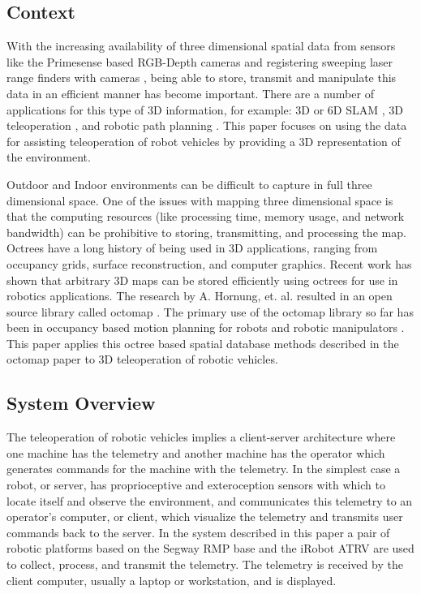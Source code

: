\documentclass[journal]{IEEEtran}
\begin{document}
  \subsection{Context}
  With the increasing availability of three dimensional spatial data from 
  sensors like the Primesense based RGB-Depth cameras \cite{PRIMESENSE} and 
  registering sweeping laser range finders with cameras \cite{5457431}, being 
  able to store, transmit and manipulate this data in an efficient manner has 
  become important.  There are a number of applications for this type of 3D 
  information, for example: 3D or 6D SLAM \cite{biswasdepth}, 3D 
  teleoperation \cite{5457431}, and robotic path planning \cite{3DCOLLISION}.
  This paper focuses on using the data for assisting teleoperation of 
  robot vehicles by providing a 3D representation of the environment.
  
  Outdoor and Indoor environments can be difficult to capture in full three 
  dimensional space.  One of the issues with mapping three dimensional 
  space is that the computing resources (like processing time, memory usage, 
  and network bandwidth) can be prohibitive to storing, transmitting, and 
  processing the map.  Octrees have a long history of being used in 3D 
  applications\cite{CITEME}, ranging from occupancy grids\cite{CITEME}, 
  surface reconstruction\cite{CITEME}, and computer graphics\cite{CITEME}.  
  Recent work has shown that arbitrary 3D maps can be stored efficiently using 
  octrees for use in robotics applications\cite{octomap}.  The research by A. 
  Hornung, et. al. resulted in an open source library called octomap 
  \cite{octomap}.  The primary use of the octomap library so far has been in 
  occupancy based motion planning for robots and robotic manipulators 
  \cite{3DCOLLISION}. This paper applies this octree based spatial database 
  methods described in the octomap paper to 3D teleoperation of robotic 
  vehicles.
  
  \subsection{System Overview}
  The teleoperation of robotic vehicles implies a client-server architecture 
  where one machine has the telemetry and another machine has the operator 
  which generates commands for the machine with the telemetry.  In the 
  simplest case a robot, or server, has proprioceptive and exteroception 
  sensors with which to locate itself and observe the environment, and 
  communicates this telemetry to an operator's computer, or client, which 
  visualize the telemetry and transmits user commands back to the server.  In 
  the system described in this paper a pair of robotic platforms based on the 
  Segway RMP base and the iRobot ATRV are used to collect, process, and 
  transmit the telemetry.  The telemetry is received by the client computer, 
  usually a laptop or workstation, and is displayed.
  
\end{document}
